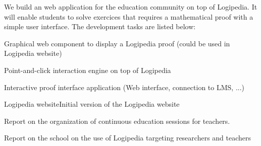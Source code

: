 \begin{workpackage}[id=dissemination,type=MGT,
  short={Dissemination},
  title={Dissemination, communication and exploitation},
  lead=Inr,InrRM=12,BirRM=4,IrtRM=4,ImtRM=2,StrRM=2,ZibRM=14,EduRM=12]
\begin{tasklist}
  \begin{task}[id=edukera,
      title=Web interface for doing proofs at school,
      lead=Edu,EduRM=12,wphases=12-24]
    We build an web application for the education community on top of Logipedia. It will
    enable students to solve exercices that requires a mathematical proof with a simple
    user interface.
    The development tasks are listed below:
    \begin{compactitem}
    \item Graphical web component to display a Logipedia proof (could be used in Logipedia website)
    \item Point-and-click interaction engine on top of Logipedia
    \item Interactive proof interface application (Web interface, connection to LMS, ...)
    \end{compactitem}
  \end{task}

\end{tasklist}

\begin{wpdelivs}


  \begin{wpdeliv}[due=1,miles=startup,id=requirements,dissem=PU,nature=DEC,lead=Inr]{Logipedia website}Initial version of the Logipedia website
  \end{wpdeliv}


  \begin{wpdeliv}[due=18,miles=???,id=continuoused,dissem=PU,nature=R,lead=Str]{
 Report on the organization of continuous education sessions for teachers.}
  \end{wpdeliv}

  \begin{wpdeliv}[due=48,miles=???,id=school-researchers,dissem=PU,nature=R,lead=Bir]{Report on the school on the use of Logipedia targeting researchers and teachers}
  \end{wpdeliv}



\end{wpdelivs}
\end{workpackage}
